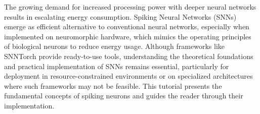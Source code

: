 \par The growing demand for increased processing power with deeper neural networks results in escalating energy consumption. Spiking Neural Networks (SNNs) emerge as efficient alternative to conventional neural networks, especially when implemented on neuromorphic hardware, which mimics the operating principles of biological neurons to reduce energy usage. Although frameworks like SNNTorch provide ready-to-use tools, understanding the theoretical foundations and practical implementation of SNNs remains essential, particularly for deployment in resource-constrained environments or on specialized architectures where such frameworks may not be feasible. This tutorial presents the fundamental concepts of spiking neurons and guides the reader through their implementation.